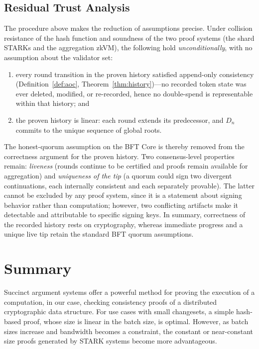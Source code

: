 \documentclass[twocolumn]{article}
\begin{document}
\subsection{Residual Trust Analysis}
\label{sec:residual-trust}

The procedure above makes the reduction of assumptions precise. Under collision resistance of the hash function and soundness of the two proof systems (the shard STARKs and the aggregation zkVM), the following hold \emph{unconditionally}, with no assumption about the validator set:

\begin{enumerate}[nosep]
  \item every round transition in the proven history satisfied append-only consistency (Definition~\ref{def:aoc}, Theorem~\ref{thm:history})---no recorded token state was ever deleted, modified, or re-recorded, hence no double-spend is representable within that history; and
  \item the proven history is linear: each round extends its predecessor, and $D_n$ commits to the unique sequence of global roots.
\end{enumerate}

The honest-quorum assumption on the BFT Core is thereby removed from the correctness argument for the proven history. Two consensus-level properties remain: \emph{liveness} (rounds continue to be certified and proofs remain available for aggregation) and \emph{uniqueness of the tip} (a quorum could sign two divergent continuations, each internally consistent and each separately provable). The latter cannot be excluded by any proof system, since it is a statement about signing behavior rather than computation; however, two conflicting artifacts make it detectable and attributable to specific signing keys. In summary, correctness of the recorded history rests on cryptography, whereas immediate progress and a unique live tip retain the standard BFT quorum assumptions.

\section{Summary}

Succinct argument systems offer a powerful method for proving the execution of a computation, in our case, checking consistency proofs of a distributed cryptographic data structure. For use cases with small changesets, a simple hash-based proof, whose size is linear in the batch size, is optimal. However, as batch sizes increase and bandwidth becomes a constraint, the constant or near-constant size proofs generated by STARK systems become more advantageous.
\end{document}
